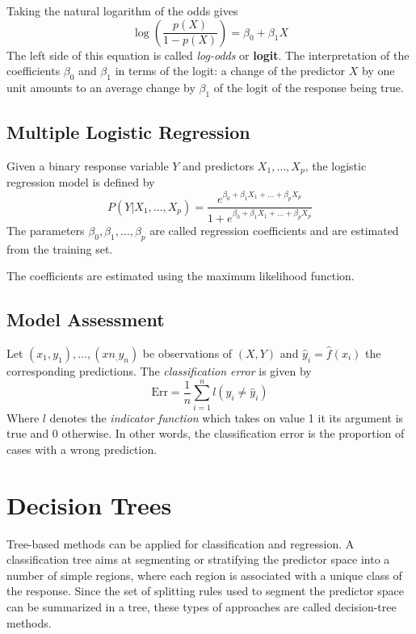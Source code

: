 \documentclass[11pt]{article}
\begin{document}
Taking the natural logarithm of the odds gives
\begin{equation*}
	\log\left(\frac{p(X)}{1-p(X)}\right) = \beta_0+\beta_1 X
\end{equation*}
The left side of this equation is called \emph{log-odds} or \textbf{logit}. The interpretation of the coefficients $\beta_0$ and $\beta_1$ in terms of the logit: a change of the predictor $X$ by one unit amounts to an average change by $\beta_1$ of the logit of the response being true.

\subsection{Multiple Logistic Regression}
\begin{definition}
	Given a binary response variable $Y$ and predictors $X_1,\dots,X_p$, the logistic regression model is defined by
	\begin{equation*}
		P(Y|X_1,\dots,X_p) = \frac{e^{\beta_0+\beta_1 X_1 + \dots + \beta_p X_p}}{1+e^{\beta_0+\beta_1 X_1 + \dots + \beta_p X_p}}
	\end{equation*}
	The parameters $\beta_0,\beta_1,\dots,\beta_p$ are called regression coefficients and are estimated from the training set.
\end{definition}
The coefficients are estimated using the maximum likelihood function.

\subsection{Model Assessment}
\begin{definition}
	Let $(x_1, y_1),\dots,(x n_,y_n)$ be observations of $(X,Y)$ and $\hat{y}_i = \hat{f}(x_i)$ the corresponding predictions. The \emph{classification error} is given by
	\begin{equation*}
		\text{Err} = \frac{1}{n}\sum_{i=1}^{n} l(y_i \neq \hat{y}_i)
	\end{equation*}
	Where $l$ denotes the \emph{indicator function} which takes on value 1 it its argument is true and 0 otherwise. In other words, the classification error is the proportion of cases with a wrong prediction.
\end{definition}

\section{Decision Trees}
Tree-based methods can be applied for classification and regression. A classification tree aims at segmenting or stratifying the predictor space into a number of simple regions, where each region is associated with a unique class of the response. Since the set of splitting rules used to segment the predictor space can be summarized in a tree, these types of approaches are called decision-tree methods.
\end{document}
